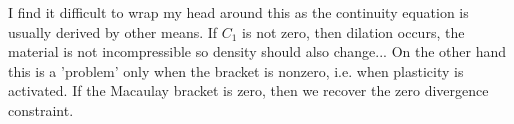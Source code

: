 
I find it difficult to wrap my head around this as the continuity equation 
is usually derived by other means. 
If $C_1$ is not zero, then dilation occurs, the material is not incompressible
so density should also change...  
On the other hand this is a 'problem' only when the bracket is nonzero, i.e. when
plasticity is activated. If the Macaulay bracket is zero, then we recover 
the zero divergence constraint.



